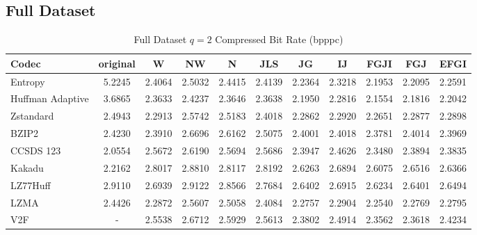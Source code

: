 \documentclass{article}
\begin{document}
\subsection{Full Dataset}
\begin{table}[h!]
\centering
\caption{Full Dataset $q=2$ Compressed Bit Rate (bpppc)}
\begin{tabular}{|l|cccccccccc|}
\hline
Codec &  original &      W &     NW &      N &    JLS &     JG &     IJ &   FGJI &    FGJ &   EFGI \\
\hline
Entropy & 5.2245 & 2.4064 & 2.5032 & 2.4415 & 2.4139 & 2.2364 & 2.3218 & 2.1953 & 2.2095 & 2.2591 \\
\hline
Huffman Adaptive &    3.6865 & 2.3633 & 2.4237 & 2.3646 & 2.3638 & 2.1950 & 2.2816 & 2.1554 & 2.1816 & 2.2042 \\
Zstandard        &    2.4943 & 2.2913 & 2.5742 & 2.5183 & 2.4018 & 2.2862 & 2.2920 & 2.2651 & 2.2877 & 2.2898 \\
BZIP2            &    2.4230 & 2.3910 & 2.6696 & 2.6162 & 2.5075 & 2.4001 & 2.4018 & 2.3781 & 2.4014 & 2.3969 \\
CCSDS 123        &    2.0554 & 2.5672 & 2.6190 & 2.5694 & 2.5686 & 2.3947 & 2.4626 & 2.3480 & 2.3894 & 2.3835 \\
Kakadu           &    2.2162 & 2.8017 & 2.8810 & 2.8117 & 2.8192 & 2.6263 & 2.6894 & 2.6075 & 2.6516 & 2.6366 \\
LZ77Huff         &    2.9110 & 2.6939 & 2.9122 & 2.8566 & 2.7684 & 2.6402 & 2.6915 & 2.6234 & 2.6401 & 2.6494 \\
LZMA             &    2.4426 & 2.2872 & 2.5607 & 2.5058 & 2.4084 & 2.2757 & 2.2904 & 2.2540 & 2.2769 & 2.2795 \\
V2F              &   - & 2.5538 & 2.6712 & 2.5929 & 2.5613 & 2.3802 & 2.4914 & 2.3562 & 2.3618 & 2.4234 \\
\hline
\end{tabular}
\end{table}
\end{document}
